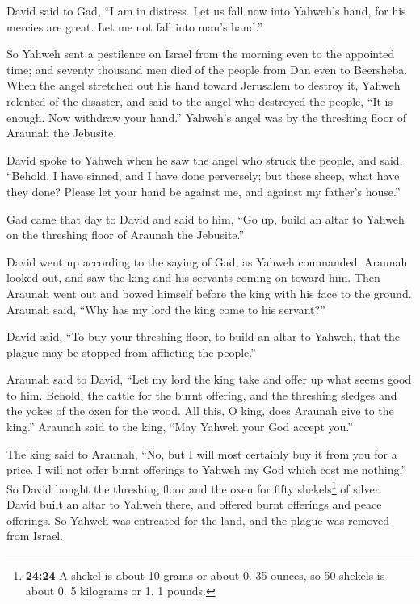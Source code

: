  David said to Gad, ``I am in distress. Let us fall now
into Yahweh's hand, for his mercies are great. Let me not fall into
man's hand.''

 So Yahweh sent a pestilence on Israel from the morning
even to the appointed time; and seventy thousand men died of the people
from Dan even to Beersheba.  When the angel stretched out
his hand toward Jerusalem to destroy it, Yahweh relented of the
disaster, and said to the angel who destroyed the people, ``It is
enough. Now withdraw your hand.'' Yahweh's angel was by the threshing
floor of Araunah the Jebusite.

 David spoke to Yahweh when he saw the angel who struck
the people, and said, ``Behold, I have sinned, and I have done
perversely; but these sheep, what have they done? Please let your hand
be against me, and against my father's house.''

 Gad came that day to David and said to him, ``Go up,
build an altar to Yahweh on the threshing floor of Araunah the
Jebusite.''

 David went up according to the saying of Gad, as Yahweh
commanded.  Araunah looked out, and saw the king and his
servants coming on toward him. Then Araunah went out and bowed himself
before the king with his face to the ground.  Araunah
said, ``Why has my lord the king come to his servant?''

David said, ``To buy your threshing floor, to build an altar to Yahweh,
that the plague may be stopped from afflicting the people.''

 Araunah said to David, ``Let my lord the king take and
offer up what seems good to him. Behold, the cattle for the burnt
offering, and the threshing sledges and the yokes of the oxen for the
wood.  All this, O king, does Araunah give to the king.''
Araunah said to the king, ``May Yahweh your God accept you.''

 The king said to Araunah, ``No, but I will most
certainly buy it from you for a price. I will not offer burnt offerings
to Yahweh my God which cost me nothing.'' So David bought the threshing
floor and the oxen for fifty shekels\footnote{\textbf{24:24} A shekel is
  about 10 grams or about 0. 35 ounces, so 50 shekels is about 0. 5
  kilograms or 1. 1 pounds.} of silver.  David built an
altar to Yahweh there, and offered burnt offerings and peace offerings.
So Yahweh was entreated for the land, and the plague was removed from
Israel.

